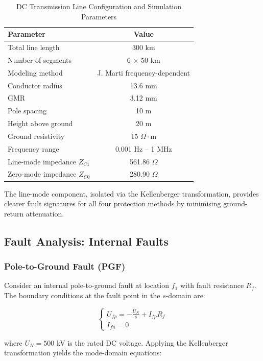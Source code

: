 \documentclass[journal]{IEEEtran}
\begin{document}
\begin{table}[!t]
\centering
\caption{DC Transmission Line Configuration and Simulation Parameters}
\label{table:line_params}
\begin{tabular}{|l|c|}
\hline
\textbf{Parameter} & \textbf{Value} \\
\hline
Total line length & 300 km \\
Number of segments & 6 $\times$ 50 km \\
Modeling method & J. Marti frequency-dependent \\
Conductor radius & 13.6 mm \\
GMR & 3.12 mm \\
Pole spacing & 10 m \\
Height above ground & 20 m \\
Ground resistivity & 15 $\Omega\cdot$m \\
Frequency range & 0.001 Hz -- 1 MHz \\
Line-mode impedance $Z_{C1}$ & 561.86 $\Omega$ \\
Zero-mode impedance $Z_{C0}$ & 280.90 $\Omega$ \\
\hline
\end{tabular}
\end{table}

The line-mode component, isolated via the Kellenberger transformation, provides clearer fault signatures for all four protection methods by minimising ground-return attenuation.

\subsection{Fault Analysis: Internal Faults}

\subsubsection{Pole-to-Ground Fault (PGF)}

Consider an internal pole-to-ground fault at location $f_1$ with fault resistance $R_f$. The boundary conditions at the fault point in the $s$-domain are:

\begin{equation}
\begin{cases}
U_{fp} = -\frac{U_N}{s} + I_{fp}R_f \\
I_{fn} = 0
\end{cases}
\end{equation}

where $U_N = 500$ kV is the rated DC voltage. Applying the Kellenberger transformation yields the mode-domain equations:
\end{document}

